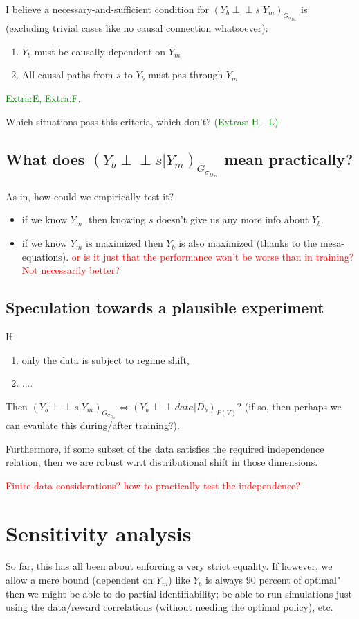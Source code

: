 \documentclass[letterpaper,10pt]{article}
\newcommand\indep{\perp \!\!\! \perp}
\begin{document}
I believe a necessary-and-sufficient condition for $(Y_b\indep s|Y_m)_{G_{\sigma_{D_m}}}$ is (excluding trivial cases like no causal connection whatsoever):
\begin{enumerate}
  \item $Y_b$ must be causally dependent on $Y_m$
  \item All causal paths from $s$ to $Y_b$ must pas through $Y_m$
\end{enumerate}
\textcolor{green}{Extra:E, Extra:F}.

Which situations pass this criteria, which don't? \textcolor{green}{(Extras: H - L)}

\subsection{What does $(Y_b\indep s|Y_m)_{G_{\sigma_{D_m}}}$ mean practically?}
As in, how could we empirically test it?

\begin{itemize}
  \item if we know $Y_m$, then knowing $s$ doesn't give us any more info about $Y_b$.
  \item if we know $Y_m$ is maximized then $Y_b$ is also maximized (thanks to the mesa-equations). \textcolor{red}{or is it just that the performance won't be worse than in training? Not necessarily better?}
\end{itemize}

\subsection{Speculation towards a plausible experiment}
If
\begin{enumerate}
  \item only the data is subject to regime shift,
  \item \textcolor{red}{....}
\end{enumerate}
Then $(Y_b\indep s|Y_m)_{G_{\sigma_{D_m}}} \iff (Y_b\indep data|D_b)_{P(V)}$?
(if so, then perhaps we can evaulate this during/after training?).

Furthermore, if some subset of the data satisfies the required independence relation, then we are robust w.r.t distributional shift in those dimensions.

\textcolor{red}{Finite data considerations? how to practically test the independence?}

\section{Sensitivity analysis}
So far, this has all been about enforcing a very strict equality. 
If however, we allow a mere bound (dependent on $Y_m$) like $Y_b$ is always 90 percent of optimal" then we might be able to do partial-identifiability; be able to run simulations just using the data/reward correlations (without needing the optimal policy), etc.
\end{document}
